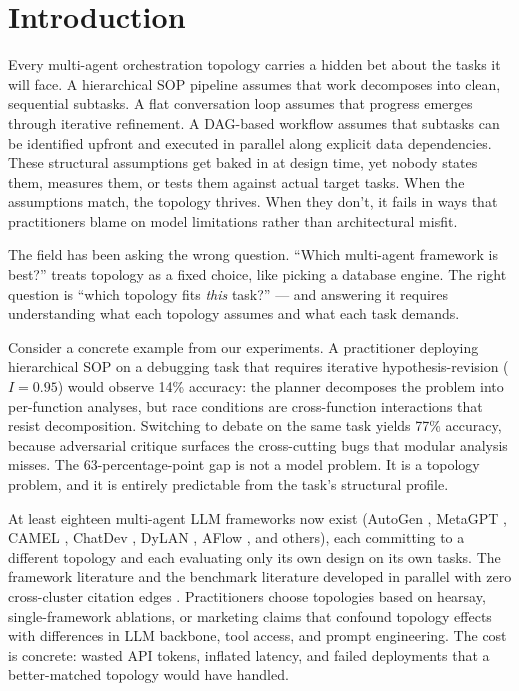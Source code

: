 \section{Introduction}

Every multi-agent orchestration topology carries a hidden bet about the tasks it will face. A hierarchical SOP pipeline assumes that work decomposes into clean, sequential subtasks. A flat conversation loop assumes that progress emerges through iterative refinement. A DAG-based workflow assumes that subtasks can be identified upfront and executed in parallel along explicit data dependencies. These structural assumptions get baked in at design time, yet nobody states them, measures them, or tests them against actual target tasks. When the assumptions match, the topology thrives. When they don't, it fails in ways that practitioners blame on model limitations rather than architectural misfit.

The field has been asking the wrong question. ``Which multi-agent framework is best?'' treats topology as a fixed choice, like picking a database engine. The right question is ``which topology fits \emph{this} task?'' --- and answering it requires understanding what each topology assumes and what each task demands.

Consider a concrete example from our experiments. A practitioner deploying hierarchical SOP on a debugging task that requires iterative hypothesis-revision ($I{=}0.95$) would observe 14\% accuracy: the planner decomposes the problem into per-function analyses, but race conditions are cross-function interactions that resist decomposition. Switching to debate on the same task yields 77\% accuracy, because adversarial critique surfaces the cross-cutting bugs that modular analysis misses. The 63-percentage-point gap is not a model problem. It is a topology problem, and it is entirely predictable from the task's structural profile.

At least eighteen multi-agent LLM frameworks now exist (AutoGen \cite{wu_2023}, MetaGPT \cite{hong_2023}, CAMEL \cite{li_2023}, ChatDev \cite{qian_2024}, DyLAN \cite{liu_2024}, AFlow \cite{aflow_2025}, and others), each committing to a different topology and each evaluating only its own design on its own tasks. The framework literature and the benchmark literature developed in parallel with zero cross-cluster citation edges \cite{mohammadi_2025}. Practitioners choose topologies based on hearsay, single-framework ablations, or marketing claims that confound topology effects with differences in LLM backbone, tool access, and prompt engineering. The cost is concrete: wasted API tokens, inflated latency, and failed deployments that a better-matched topology would have handled.

